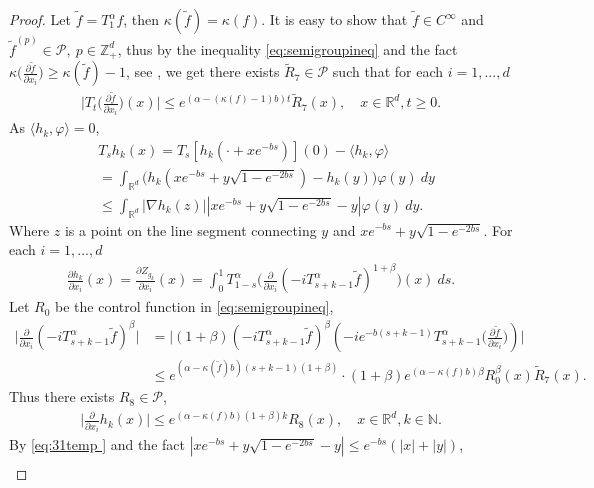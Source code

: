 \documentclass[12pt,oneside,english]{amsart}
\theoremstyle{plain}
\theoremstyle{definition}
\numberwithin{equation}{section}
\begin{document}
\begin{proof}
{ Let $\tilde{f}=T_1^{\alpha}f$, then $\kappa(\tilde{f})=\kappa(f)$. It is easy to show that $\tilde{f}\in C^{\infty}$ and $\tilde{f}^{(p)}\in\mathcal{P},~p\in\mathbb{Z}_+^d$, thus by the inequality \eqref{eq:semigroupineq} and the fact $\kappa\big(\frac{\partial \tilde{f}}{\partial x_i}\big)\geq \kappa(\tilde{f})-1$, see \cite[Lemma 2.3]{RSZ}, we get there exists $\tilde{R}_7\in \mathcal{P}$ such that for each $i=1,...,d$
 \begin{align}
 \label{ineq-temp}
     \Big|T_t\big(\frac{\partial\tilde{f}}{\partial x_i}\big)(x)\Big|\leq e^{(\alpha-(\kappa(f)-1)b)t}\tilde{R}_7(x), \quad x\in \mathbb {R}^d, t\geq 0.
 \end{align}
 As $\langle h_k,\varphi\rangle=0$,
 \begin{align}
     &T_s h_k(x)= T_s [h_k(\cdot+xe^{-bs})] (0)-\langle h_k,\varphi\rangle
     \\ &= \int_{\mathbb{R}^d}\big(h_k(xe^{-bs}+y\sqrt{1-e^{-2bs}})-h_k(y)\big)\varphi (y)~dy
     \\ &\leq \int_{\mathbb{R}^d}|\nabla h_k(z)||xe^{-bs}+y\sqrt{1-e^{-2bs}}-y|\varphi (y)~dy.
  \end{align}
 Where $z$ is a point on the line segment connecting $y$ and $xe^{-bs}+y\sqrt{1-e^{-2bs}}$. For each $i=1,...,d$
 \begin{align}
     \frac{\partial h_k}{\partial x_i}(x)=\frac{\partial Z_{g_k}}{\partial x_i}(x)=\int_0^1 T^{\alpha}_{1-s}\Big(\frac{\partial}{\partial x_i}(-i T_{s+k-1}^{\alpha} \tilde{f})^{1+\beta}\Big)(x)~ds.
 \end{align}
  Let $R_0$ be the control function in \eqref{eq:semigroupineq},
      \begin{align}
        \Big|\frac{\partial}{\partial x_i}(-i T_{s+k-1}^{\alpha}\tilde{f})^{\beta}\Big|&=\Big|(1+\beta)(-i T_{s+k-1}^{\alpha}\tilde{f})^{\beta}(-i e^{-b(s+k-1)}T_{s+k-1}^{\alpha}\big(\frac{\partial \tilde{f}}{\partial x_i}\big))\Big|\\
        &\leq e^{(\alpha-\kappa(\tilde{f})b)(s+k-1)(1+\beta)}\cdot (1+\beta)e^{(\alpha-\kappa(f)b)\beta}R_0^{\beta}(x)\tilde{R}_7(x).
    \end{align}
Thus there exists $R_8\in \mathcal{P}$,
\begin{align}
\label{eq:31temp }
    \Big|\frac{\partial}{\partial x_i}h_k(x)\Big|\leq e^{(\alpha-\kappa(f)b)(1+\beta)k}R_8(x),\quad x\in \mathbb{R}^d, k\in \mathbb{N}.
\end{align}
By \eqref{eq:31temp } and the fact $|xe^{-bs}+y\sqrt{1-e^{-2bs}}-y|\leq e^{-bs}(|x|+|y|)$,
\begin{align}

\end{align}}
\end{proof}
\end{document}
